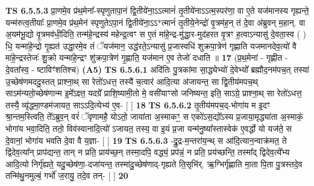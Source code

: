 \documentclass[17pt]{extarticle}
\begin{document}
                                \textbf{ TS 6.5.5.3} \newline
                  प्रा॒णमे॒व प्र॑थ॒मेना᳚-स्पृणुतापा॒नं द्वि॒तीये॑ना॒ऽऽत्मानं॑ तृ॒तीये॑नाऽऽत्म॒स्पर॑णा॒ वा ए॒ते यज॑मानस्य गृह्यन्ते॒ यन्म॑रुत्व॒तीयाः᳚ प्रा॒णमे॒व प्र॑थ॒मेन॑ स्पृणुतेऽपा॒नं द्वि॒तीये॑ना॒ऽऽ*त्मानं॑ तृ॒तीये॒नेन्द्रो॑ वृ॒त्रम॑ह॒न् तं दे॒वा अ॑ब्रुवन् म॒हान्. वा अ॒यम॑भू॒द्यो वृ॒त्रमव॑धी॒दिति॒ तन्म॑हे॒न्द्रस्य॑ महेन्द्र॒त्वꣳ स ए॒तं मा॑हे॒न्द्र-मु॑द्धा॒र-मुद॑हरत वृ॒त्रꣳ ह॒त्वाऽन्यासु॑ दे॒वता॒स्व ( ) धि॒ यन्मा॑हे॒न्द्रो गृ॒ह्यत॑ उद्धा॒रमे॒व तं ॅयज॑मान॒ उद्ध॑रते॒ऽन्यासु॑ प्र॒जास्वधि॑ शुक्रपा॒त्रेण॑ गृह्णाति यजमानदेव॒त्यो॑ वै मा॑हे॒न्द्रस्तेजः॑ शु॒क्रो यन्मा॑हे॒न्द्रꣳ शु॑क्रपा॒त्रेण॑ गृ॒ह्णाति॒ यज॑मान ए॒व तेजो॑ दधाति ॥ \textbf{  17} \newline
                  \newline
                      (प्र॒थ॒मेना॑ - गृह्णीत - दे॒वता᳚स्व॒ - ष्टाविꣳ॑शतिश्च)  \textbf{(A5)} \newline \newline
                                        \textbf{ TS 6.5.6.1} \newline
                  अदि॑तिः पु॒त्रका॑मा सा॒द्ध्येभ्यो॑ दे॒वेभ्यो᳚ ब्रह्मौद॒नम॑पच॒त् तस्या॑ उ॒च्छेष॑णमददु॒स्तत् प्राश्ना॒थ् सा रेतो॑ऽधत्त॒ तस्यै॑ च॒त्वार॑ आदि॒त्या अ॑जायन्त॒ सा द्वि॒तीय॑मपच॒थ् साऽम॑न्यतो॒च्छेष॑णान्म इ॒मे᳚ऽज्ञ्त॒ यदग्रे᳚ प्राशि॒ष्यामी॒तो मे॒ वसी॑याꣳसो जनिष्यन्त॒ इति॒ साऽग्रे॒ प्राश्ना॒थ् सा रेतो॑ऽधत्त॒ तस्यै॒ व्यृ॑द्धमा॒ण्डम॑जायत॒ साऽऽदि॒त्येभ्य॑ ए॒व- [  ] \textbf{  18} \newline
                  \newline
                                \textbf{ TS 6.5.6.2} \newline
                  तृ॒तीय॑मपच॒द्-भोगा॑य म इ॒दꣳ श्रा॒न्तम॒स्त्विति॒ ते᳚ऽब्रुव॒न् वरं॑ ॅवृणामहै॒ योऽतो॒ जाया॑ता अ॒स्माकꣳ॒॒ स एको॑ऽस॒द्यो᳚ऽस्य प्र॒जाया॒मृद्ध्या॑ता अ॒स्माकं॒ भोगा॑य भवा॒दिति॒ ततो॒ विव॑स्वानादि॒त्यो॑ ऽजायत॒ तस्य॒ वा इ॒यं प्र॒जा यन्म॑नु॒ष्या᳚स्तास्वेक॑ ए॒वर्द्धो यो यज॑ते॒ स दे॒वानां॒ भोगा॑य भवति दे॒वा वै य॒ज्ञा- [  ] \textbf{  19} \newline
                  \newline
                                \textbf{ TS 6.5.6.3} \newline
                  -द्रु॒द्र-म॒न्तरा॑य॒न्थ् स आ॑दि॒त्यान॒न्वाक्र॑मत॒ ते द्वि॑देव॒त्या᳚न् प्राप॑द्यन्त॒ तान् न प्रति॒ प्राय॑च्छ॒न् तस्मा॒दपि॒ वद्ध्यं॒ प्रप॑न्नं॒ न प्रति॒ प्रय॑च्छन्ति॒ तस्मा᳚द् द्विदेव॒त्ये᳚भ्य आदि॒त्यो निर्गृ॑ह्यते॒ यदु॒च्छेष॑णा॒-दजा॑यन्त॒ तस्मा॑दु॒च्छेष॑णाद्-गृह्यते ति॒सृभि॑र्. ऋ॒ग्भिर्गृ॑ह्णाति मा॒ता पि॒ता पु॒त्रस्तदे॒व तन्मि॑थु॒नमुल्बं॒ गर्भो॑ ज॒रायु॒ तदे॒व तन्- [  ] \textbf{  20} \newline
\end{document}
